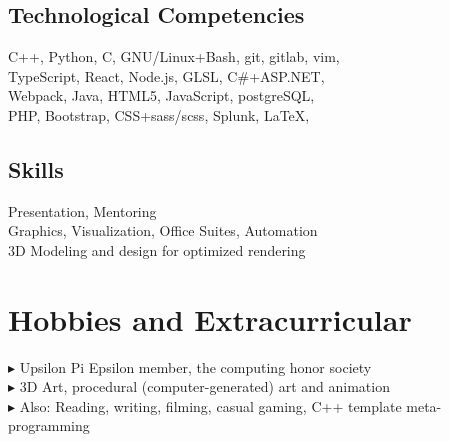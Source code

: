 \documentclass[Letterpaper,11pt]{article}
\newcommand{\bul}{$\blacktriangleright$ }
\begin{document}
\begin{multicols}{2}

    \subsection*{Technological Competencies}

        C++, Python, C, GNU/Linux+Bash, git, gitlab, vim, \\
        TypeScript, React, Node.js, GLSL, C\#+ASP.NET, \\
        Webpack, Java, HTML5, JavaScript, postgreSQL, \\ 
        PHP, Bootstrap, CSS+sass/scss, Splunk, \LaTeX, \\

    \subsection*{Skills}

        Presentation, Mentoring\\
        Graphics, Visualization, Office Suites, Automation\\
        3D Modeling and design for optimized rendering

\end{multicols}

\section*{Hobbies and Extracurricular}

    \bul Upsilon Pi Epsilon member, the computing honor society\\
    \bul 3D Art, procedural (computer-generated) art and animation\\
    \bul Also: Reading, writing, filming, casual gaming, C++ template meta-programming

\clearpage
\end{document}
